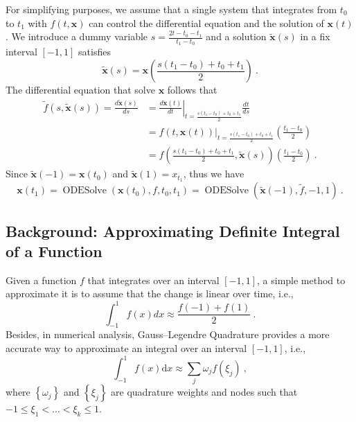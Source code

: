 For simplifying purposes, we assume that a single system that integrates from $t_0$ to $t_1$ with $f(t, \textbf{x})$ can control the differential equation and the solution of $\textbf{x}(t)$. We introduce a dummy variable $s=\frac{2t - t_0 - t_1}{t_1 - t_0}$ and a solution $\mathbf{\tilde{x}}(s)$ in a fix interval $[-1, 1]$ satisfies
\begin{equation}
    \tilde{\textbf{x}}(s) = \textbf{x}(\frac{s(t_1 - t_0) + t_0 + t_1}{2}) ~.
\end{equation}
The differential equation that solve $\mathbf{x}$ follows that
\begin{equation}
\begin{aligned}
\tilde{f}(s, \tilde{\textbf{x}}(s)) = \frac{d \tilde{\textbf{x}}(s)}{d s} & =\left.\frac{d \textbf{x}(t)}{d t}\right|_{t=\frac{s(t_1 - t_0) + t_0 + t_1}{2}} \frac{d t}{d s} \\
& =\left.f(t, \textbf{x}(t))\right|_{t=\frac{s(t_1 - t_0) + t_0 + t_1}{2}}\left(\frac{t_1 - t_0}{2}\right) \\
& =f\left(\frac{s(t_1 - t_0) + t_0 + t_1}{2}, \tilde{\textbf{x}}(s)\right)\left(\frac{t_1 - t_0}{2}\right) ~.
\end{aligned}
\end{equation}
Since $\tilde{\textbf{x}}(-1)=\textbf{x}(t_0)$ and $\tilde{\textbf{x}}(1)=x_{t_1}$, thus we have
\begin{equation}
    \textbf{x}(t_1)= \operatorname{ODESolve}(\textbf{x}(t_0), f, t_0, t_1) = \operatorname{ODESolve}(\tilde{\textbf{x}}(-1), \tilde{f}, -1, 1) ~.
\end{equation}

\subsection{Background: Approximating Definite Integral of a Function} \label{sec:approximating}

Given a function $f$ that integrates over an interval $[-1, 1]$, a simple method to approximate it is to assume that the change is linear over time, i.e.,
\begin{equation}
\int_{-1}^{1} f(x) d x \approx \frac{f(-1) + f(1)}{2} ~.
\end{equation}
Besides, in numerical analysis, Gauss–Legendre Quadrature provides a more accurate way to approximate an integral over an interval $[-1, 1]$, i.e.,
\begin{equation}
\int_{-1}^1 f(x) \mathrm{d} x \approx \sum_j \omega_j f\left(\xi_j\right) ~,
\end{equation}
where $\left\{\omega_j\right\}$ and $\left\{\xi_j\right\}$ are quadrature weights and nodes such that $-1 \leq \xi_1 < ... < \xi_k \leq 1$.

